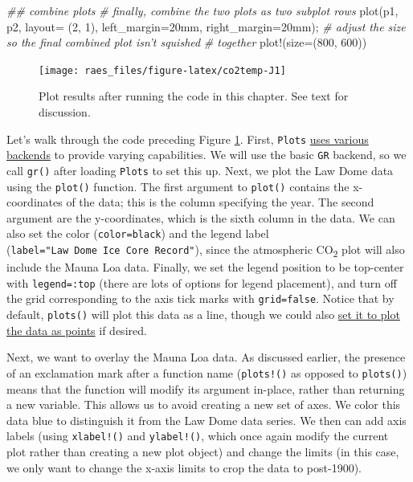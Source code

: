 \documentclass[
  11pt,
]{book}
\newenvironment{Shaded}{\begin{snugshade}}{\end{snugshade}}
\newcommand{\CommentTok}[1]{\textcolor[rgb]{0.37,0.37,0.37}{\textit{#1}}}
\newcommand{\FloatTok}[1]{\textcolor[rgb]{0.06,0.06,0.06}{#1}}
\newcommand{\NormalTok}[1]{#1}
\begin{document}
\begin{Shaded}
\begin{Highlighting}[]
\CommentTok{## combine plots}
\CommentTok{# finally, combine the two plots as two subplot rows}
\NormalTok{plot(p1, p2, layout= (}\FloatTok{2}\NormalTok{, }\FloatTok{1}\NormalTok{), left_margin=}\FloatTok{20}\NormalTok{mm, }
\NormalTok{    right_margin=}\FloatTok{20}\NormalTok{mm); }
\CommentTok{# adjust the size so the final combined plot isn't squished }
\CommentTok{# together}
\NormalTok{plot!(size=(}\FloatTok{800}\NormalTok{, }\FloatTok{600}\NormalTok{)) }
\end{Highlighting}
\end{Shaded}

\begin{figure}

{\centering \texttt{[image: raes\_files/figure-latex/co2temp-J1]} 

}

\caption{Plot results after running the code in this chapter. See text for discussion.}\label{fig:co2temp}
\end{figure}

Let's walk through the code preceding Figure \ref{fig:co2temp}. First, \texttt{Plots} \href{http://docs.juliaplots.org/latest/backends/}{uses various backends} to provide varying capabilities. We will use the basic \texttt{GR} backend, so we call \texttt{gr()} after loading \texttt{Plots} to set this up. Next, we plot the Law Dome data using the \texttt{plot()} function. The first argument to \texttt{plot()} contains the x-coordinates of the data; this is the column specifying the year. The second argument are the y-coordinates, which is the sixth column in the data. We can also set the color (\texttt{color=black}) and the legend label (\texttt{label="Law\ Dome\ Ice\ Core\ Record"}), since the atmospheric CO\textsubscript{2} plot will also include the Mauna Loa data. Finally, we set the legend position to be top-center with \texttt{legend=:top} (there are lots of options for legend placement), and turn off the grid corresponding to the axis tick marks with \texttt{grid=false}. Notice that by default, \texttt{plots()} will plot this data as a line, though we could also \href{http://docs.juliaplots.org/latest/tutorial/\#Changing-the-Plotting-Series}{set it to plot the data as points} if desired.

Next, we want to overlay the Mauna Loa data. As discussed earlier, the presence of an exclamation mark after a function name (\texttt{plots!()} as opposed to \texttt{plots()}) means that the function will modify its argument in-place, rather than returning a new variable. This allows us to avoid creating a new set of axes. We color this data blue to distinguish it from the Law Dome data series. We then can add axis labels (using \texttt{xlabel!()} and \texttt{ylabel!()}, which once again modify the current plot rather than creating a new plot object) and change the limits (in this case, we only want to change the x-axis limits to crop the data to post-1900).
\end{document}
